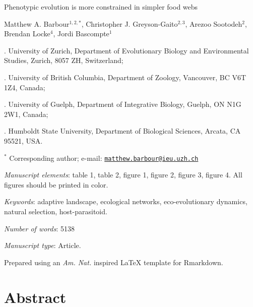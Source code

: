 \documentclass[11pt,]{article}
\title{}
\author{}
\date{}
\begin{document}
\vspace*{0.1cm}

\begin{center} \LARGE Phenotypic evolution is more constrained in simpler food webs \end{center}

\bigskip

\begin{center} \large Matthew A. Barbour$^{1,2,\ast}$, Christopher J. Greyson-Gaito$^{2,3}$, Arezoo Sootodeh$^{2}$, Brendan Locke$^{4}$, Jordi Bascompte$^{1}$ \normalsize \end{center}

\bigskip

. University of Zurich, Department of Evolutionary Biology
and Environmental Studies, Zurich, 8057 ZH, Switzerland;

. University of British Columbia, Department of Zoology,
Vancouver, BC V6T 1Z4, Canada;

. University of Guelph, Department of Integrative Biology,
Guelph, ON N1G 2W1, Canada;

. Humboldt State University, Department of Biological
Sciences, Arcata, CA 95521, USA.

\(^\ast\) Corresponding author; e-mail:
\href{mailto:matthew.barbour@ieu.uzh.ch}{\nolinkurl{matthew.barbour@ieu.uzh.ch}}

\bigskip

\emph{Manuscript elements}: table 1, table 2, figure 1, figure 2, figure
3, figure 4. All figures should be printed in color.

\bigskip

\emph{Keywords}: adaptive landscape, ecological networks,
eco-evolutionary dynamics, natural selection, host-parasitoid.

\bigskip

\emph{Number of words}: 5138

\bigskip

\emph{Manuscript type}: Article.

\bigskip

\footnotesize Prepared using an \emph{Am. Nat.} inspired \LaTeX{}
template for Rmarkdown. \normalsize

\linenumbers{} \modulolinenumbers[3]

\newpage

\section{Abstract}\label{abstract}
\end{document}
